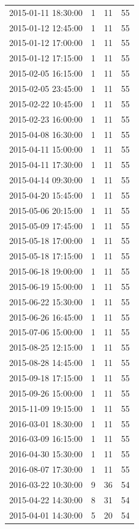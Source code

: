\begin{tabular}{lrrr}
2015-01-11 18:30:00 & 1 & 11 & 55 \\
2015-01-12 12:45:00 & 1 & 11 & 55 \\
2015-01-12 17:00:00 & 1 & 11 & 55 \\
2015-01-12 17:15:00 & 1 & 11 & 55 \\
2015-02-05 16:15:00 & 1 & 11 & 55 \\
2015-02-05 23:45:00 & 1 & 11 & 55 \\
2015-02-22 10:45:00 & 1 & 11 & 55 \\
2015-02-23 16:00:00 & 1 & 11 & 55 \\
2015-04-08 16:30:00 & 1 & 11 & 55 \\
2015-04-11 15:00:00 & 1 & 11 & 55 \\
2015-04-11 17:30:00 & 1 & 11 & 55 \\
2015-04-14 09:30:00 & 1 & 11 & 55 \\
2015-04-20 15:45:00 & 1 & 11 & 55 \\
2015-05-06 20:15:00 & 1 & 11 & 55 \\
2015-05-09 17:45:00 & 1 & 11 & 55 \\
2015-05-18 17:00:00 & 1 & 11 & 55 \\
2015-05-18 17:15:00 & 1 & 11 & 55 \\
2015-06-18 19:00:00 & 1 & 11 & 55 \\
2015-06-19 15:00:00 & 1 & 11 & 55 \\
2015-06-22 15:30:00 & 1 & 11 & 55 \\
2015-06-26 16:45:00 & 1 & 11 & 55 \\
2015-07-06 15:00:00 & 1 & 11 & 55 \\
2015-08-25 12:15:00 & 1 & 11 & 55 \\
2015-08-28 14:45:00 & 1 & 11 & 55 \\
2015-09-18 17:15:00 & 1 & 11 & 55 \\
2015-09-26 15:00:00 & 1 & 11 & 55 \\
2015-11-09 19:15:00 & 1 & 11 & 55 \\
2016-03-01 18:30:00 & 1 & 11 & 55 \\
2016-03-09 16:15:00 & 1 & 11 & 55 \\
2016-04-30 15:30:00 & 1 & 11 & 55 \\
2016-08-07 17:30:00 & 1 & 11 & 55 \\
2016-03-22 10:30:00 & 9 & 36 & 54 \\
2015-04-22 14:30:00 & 8 & 31 & 54 \\
2015-04-01 14:30:00 & 5 & 20 & 54 \\

\end{tabular}
